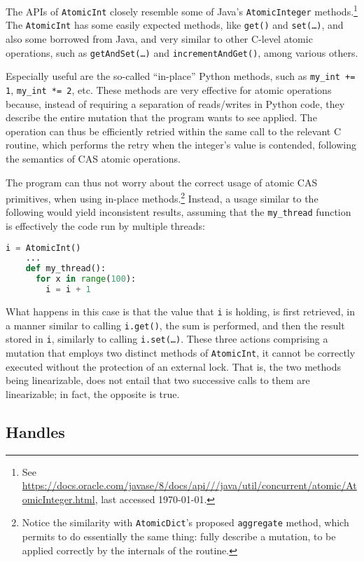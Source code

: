 The APIs of \texttt{AtomicInt} closely resemble some of Java's \texttt{AtomicInteger} methods.\footnote{%
    See \url{https://docs.oracle.com/javase/8/docs/api///java/util/concurrent/atomic/AtomicInteger.html}, last accessed \today.
}
The \texttt{AtomicInt} has some easily expected methods, like \texttt{{get()}} and \texttt{{set(\ldots)}}, and also some borrowed from Java, and very similar to other C-level atomic operations, such as \texttt{getAndSet(\ldots)} and \texttt{{incrementAndGet()}}, among various others.

Especially useful are the so-called ``in-place'' Python methods, such as \texttt{my\_int += 1}, \texttt{my\_int *= 2}, etc.
These methods are very effective for atomic operations because, instead of requiring a separation of reads/writes in Python code, they describe the entire mutation that the program wants to see applied.
The operation can thus be efficiently retried within the same call to the relevant C routine, which performs the retry when the integer's value is contended, following the semantics of CAS atomic operations\@.

The program can thus not worry about the correct usage of atomic CAS primitives, when using in-place methods.\footnote{%
    Notice the similarity with \texttt{AtomicDict}'s proposed \texttt{aggregate} method, which permits to do essentially the same thing: fully describe a mutation, to be applied correctly by the internals of the routine.
}
Instead, a usage similar to the following would yield inconsistent results, assuming that the \texttt{my\_thread} function is effectively the code run by multiple threads:
\begin{lstlisting}[label={lst:atomic-int-bad}, language=Python]
    i = AtomicInt()
    ...
    def my_thread():
      for x in range(100):
        i = i + 1
\end{lstlisting}

What happens in this case is that the value that \texttt{i} is holding, is first retrieved, in a manner similar to calling \texttt{{i.get()}}, the sum is performed, and then the result stored in \texttt{i}, similarly to calling \texttt{{i.set(\ldots)}}.
These three actions comprising a mutation that employs two distinct methods of \texttt{AtomicInt}, it cannot be correctly executed without the protection of an external lock.
That is, the two methods being linearizable, does not entail that two successive calls to them are linearizable; in fact, the opposite is true.


\subsection{Handles}\label{subsec:atomic-int-handles}

